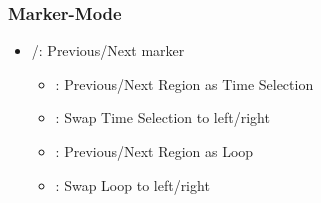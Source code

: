\subsubsection{Marker-Mode}
\begin{itemize}
\item \rewind/\forward: Previous/Next marker
\bemod
\begin{itemize}
	\item \option: Previous/Next Region as Time Selection
	\item \shift \option: Swap Time Selection to left/right
	\item \alt: Previous/Next Region as Loop
	\item \control \alt:  Swap Loop to left/right
\end{itemize}
\end{itemize}

